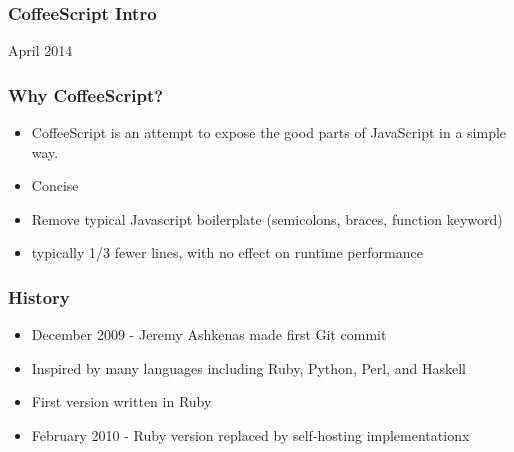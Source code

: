 \documentclass{beamer}
\begin{document}
\begin{frame}
  \frametitle{CoffeeScript Intro}

  April 2014

\end{frame}

\begin{frame}
  \frametitle{Why CoffeeScript?}
  \begin{itemize}
    \pause
    \item CoffeeScript is an attempt to expose the good parts of
      JavaScript in a simple way.
      \pause
    \item Concise
      \pause
    \item Remove typical Javascript boilerplate (semicolons, braces,
      function keyword)
      \pause
    \item  typically 1/3 fewer lines, with no effect on runtime performance
  \end{itemize}
\end{frame}

\begin{frame}
  \frametitle{History}
  \begin{itemize}
    \item December 2009 - Jeremy Ashkenas made first Git commit
    \pause
    \item Inspired by many languages including Ruby, Python, Perl, and Haskell
      \pause
    \item First version written in Ruby
      \pause
    \item February 2010 - Ruby version replaced by self-hosting implementationx
  \end{itemize}  
\end{frame}
\end{document}
